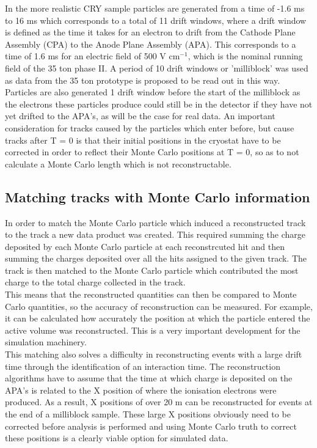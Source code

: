 \documentclass[11pt]{report} %
\begin{document}
{In the more realistic CRY sample particles are generated from a time of -1.6 ms to 16 ms which corresponds to a total of 11 drift windows, where a drift window is defined as the time it takes for an electron to drift from the Cathode Plane Assembly (CPA) to the Anode Plane Assembly (APA). This corresponds to a time of 1.6 ms for an electric field of 500 V cm\(^{-1}\), which is the nominal running field of the 35 ton phase II. A period of 10 drift windows or 'milliblock' was used as data from the 35 ton prototype is proposed to be read out in this way. Particles are also generated 1 drift window before the start of the milliblock as the electrons these particles produce could still be in the detector if they have not yet drifted to the APA's, as will be the case for real data. An important consideration for tracks caused by the particles which enter before, but cause tracks after T = 0 is that their initial positions in the cryostat have to be corrected in order to reflect their Monte Carlo positions at T = 0, so as to not calculate a Monte Carlo length which is not reconstructable.  

\subsection{Matching tracks with Monte Carlo information}
In order to match the Monte Carlo particle which induced a reconstructed track to the track a new data product was created. This required summing the charge deposited by each Monte Carlo particle at each reconstrcuted hit and then summing the charges deposited over all the hits assigned to the given track. The track is then matched to the Monte Carlo particle which contributed the most charge to the total charge collected in the track. \\

This means that the reconstructed quantities can then be compared to Monte Carlo quantities, so the accuracy of reconstruction can be measured. For example, it can be calculated how accurately the position at which the particle entered the active volume was reconstructed. This is a very important development for the simulation machinery.\\

This matching also solves a difficulty in reconstructing events with a large drift time through the identification of an interaction time. The reconstruction algorithms have to assume that the time at which charge is deposited on the APA's is related to the X position of where the ionisation electrons were produced. As a result, X positions of over 20 m can be reconstructed for events at the end of a milliblock sample. These large X positions obviously need to be corrected before analysis is performed and using Monte Carlo truth to correct these positions is a clearly viable option for simulated data.

}
\end{document}

